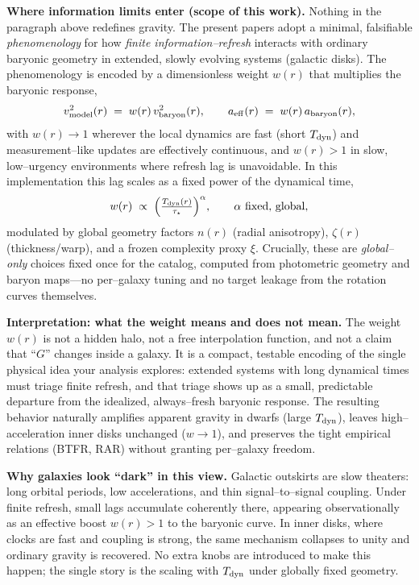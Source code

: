\documentclass[usenatbib]{mnras}
\begin{document}
\vspace{0.5em}
\noindent\textbf{Where information limits enter (scope of this work).}
Nothing in the paragraph above redefines gravity. The present papers adopt a minimal, falsifiable \emph{phenomenology} for how \emph{finite information–refresh} interacts with ordinary baryonic geometry in extended, slowly evolving systems (galactic disks). The phenomenology is encoded by a dimensionless weight \(w(r)\) that multiplies the baryonic response,
\[
v_{\rm model}^2(r) \;=\; w(r)\,v_{\rm baryon}^2(r),
\qquad
a_{\rm eff}(r) \;=\; w(r)\,a_{\rm baryon}(r),
\]
with $w(r)\to 1$ wherever the local dynamics are fast (short $T_{\rm dyn}$) and measurement–like updates are effectively continuous, and $w(r)>1$ in slow, low–urgency environments where refresh lag is unavoidable. In this implementation this lag scales as a fixed power of the dynamical time,
\[
w(r)\;\propto\;\Big(\tfrac{T_{\rm dyn}(r)}{\tau_\star}\Big)^{\alpha},
\qquad \alpha \text{ fixed, global},
\]
modulated by global geometry factors $n(r)$ (radial anisotropy), $\zeta(r)$ (thickness/warp), and a frozen complexity proxy $\xi$.
Crucially, these are \emph{global–only} choices fixed once for the catalog, computed from photometric geometry and baryon maps—no per–galaxy tuning and no target leakage from the rotation curves themselves.

\vspace{0.5em}
\noindent\textbf{Interpretation: what the weight means and does not mean.}
The weight $w(r)$ is not a hidden halo, not a free interpolation function, and not a claim that “$\!G\!$” changes inside a galaxy. It is a compact, testable encoding of the single physical idea your analysis explores:
extended systems with long dynamical times must triage finite refresh, and that triage shows up as a small, predictable departure from the idealized, always–fresh baryonic response.
The resulting behavior naturally amplifies apparent gravity in dwarfs (large $T_{\rm dyn}$), leaves high–acceleration inner disks unchanged ($w\to 1$), and preserves the tight empirical relations (BTFR, RAR) without granting per–galaxy freedom.

\vspace{0.5em}
\noindent\textbf{Why galaxies look ``dark'' in this view.}
Galactic outskirts are slow theaters: long orbital periods, low accelerations, and thin signal–to–signal coupling. Under finite refresh, small lags accumulate coherently there, appearing observationally as an effective boost $w(r)>1$ to the baryonic curve. In inner disks, where clocks are fast and coupling is strong, the same mechanism collapses to unity and ordinary gravity is recovered. No extra knobs are introduced to make this happen; the single story is the scaling with $T_{\rm dyn}$ under globally fixed geometry.
\end{document}
